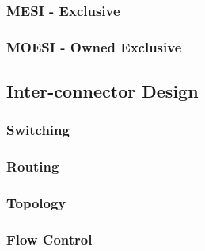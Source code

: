 \documentclass[informationsecurity]{gucmasterproject}
\begin{document}
\subsubsection{MESI - Exclusive}
\subsubsection{MOESI - Owned Exclusive}
\subsection{Inter-connector Design}
\subsubsection{Switching}
\subsubsection{Routing}
\subsubsection{Topology}
\subsubsection{Flow Control}


\end{document}
